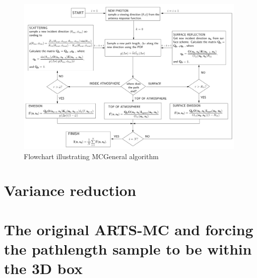 \begin{figure}
\begin{center}
\includegraphics[width=\vsize,angle=90]{flowchart2}
\caption{Flowchart illustrating MCGeneral algorithm}
\end{center}
\label{fig:montecarlo:flowchart}
\end{figure}

\section{Variance reduction}

\section{The original ARTS-MC and forcing the pathlength sample to be within the 3D box} 
 

